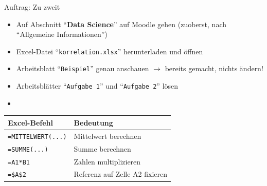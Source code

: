 \begin{frame}[fragile]{Auftrag: Zu zweit}
    \begin{itemize}
        \item Auf Abschnitt \enquote{\textbf{Data Science}} auf Moodle gehen (zuoberst, nach \enquote{Allgemeine Informationen})
        \item Excel-Datei \enquote{\texttt{korrelation.xlsx}} herunterladen und öffnen
        \item Arbeitsblatt \enquote{\texttt{Beispiel}} genau anschauen $\rightarrow$ bereits gemacht, nichts ändern!
        \item Arbeitsblätter \enquote{\texttt{Aufgabe 1}} und \enquote{\texttt{Aufgabe 2}} lösen
        \item {}
    \end{itemize}

    \begin{table}[H]
        \centering
        \begin{tabular}{l|l}
            \textbf{Excel-Befehl}   & \textbf{Bedeutung}             \\\midrule\midrule
            \verb|=MITTELWERT(...)| & Mittelwert berechnen           \\\midrule
            \verb|=SUMME(...)|      & Summe berechnen                \\\midrule
            \verb|=A1*B1|           & Zahlen multiplizieren          \\\midrule
            \verb|=$A$2|            & Referenz auf Zelle A2 fixieren \\
        \end{tabular}
    \end{table}
\end{frame}

